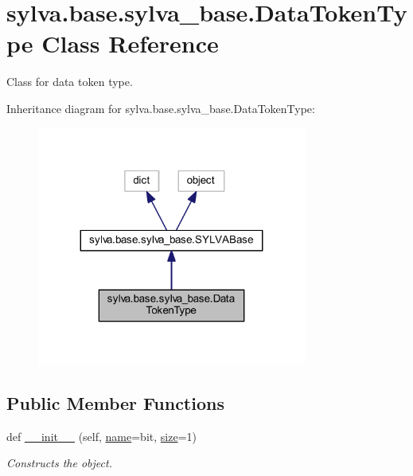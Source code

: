 \hypertarget{classsylva_1_1base_1_1sylva__base_1_1_data_token_type}{}\section{sylva.\+base.\+sylva\+\_\+base.\+Data\+Token\+Type Class Reference}
\label{classsylva_1_1base_1_1sylva__base_1_1_data_token_type}


Class for data token type.  




Inheritance diagram for sylva.\+base.\+sylva\+\_\+base.\+Data\+Token\+Type\+:\nopagebreak
\begin{figure}[H]
\begin{center}
\leavevmode
\includegraphics[width=251pt]{classsylva_1_1base_1_1sylva__base_1_1_data_token_type__inherit__graph}
\end{center}
\end{figure}
\subsection*{Public Member Functions}
\begin{DoxyCompactItemize}
\item 
def \hyperlink{classsylva_1_1base_1_1sylva__base_1_1_data_token_type_ac498e216378d20388bbfa59a83616a38}{\+\_\+\+\_\+init\+\_\+\+\_\+} (self, \hyperlink{classsylva_1_1base_1_1sylva__base_1_1_data_token_type_acec25e05f040a88de235901b1096f4a8}{name}=\textquotesingle{}bit\textquotesingle{}, \hyperlink{classsylva_1_1base_1_1sylva__base_1_1_data_token_type_ad2a181eb47ed614abc21072faf2e6849}{size}=1)
\begin{DoxyCompactList}\small\item\em Constructs the object. \end{DoxyCompactList}\end{DoxyCompactItemize}
